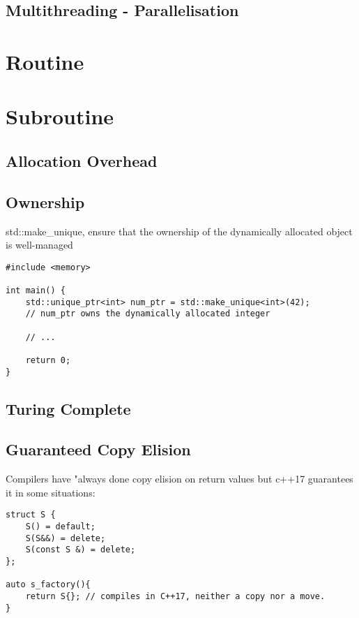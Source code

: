\documentclass[openany]{report}
\begin{document}
\subsection{Multithreading - Parallelisation}

\section{Routine}
\section{Subroutine}


\subsection{Allocation Overhead}
\subsection{Ownership}

std::make\_unique, ensure that the ownership of the dynamically allocated object is well-managed 


\begin{verbatim}
#include <memory>

int main() {
    std::unique_ptr<int> num_ptr = std::make_unique<int>(42);
    // num_ptr owns the dynamically allocated integer

    // ...
    
    return 0;
}
\end{verbatim}


\subsection{Turing Complete}


\subsection{Guaranteed Copy Elision}

Compilers have "always done copy elision on return values but c++17 guarantees it in some situations:

\begin{verbatim}
struct S {
    S() = default;
    S(S&&) = delete;
    S(const S &) = delete;
};

auto s_factory(){
    return S{}; // compiles in C++17, neither a copy nor a move.
}
\end{verbatim}
\end{document}
